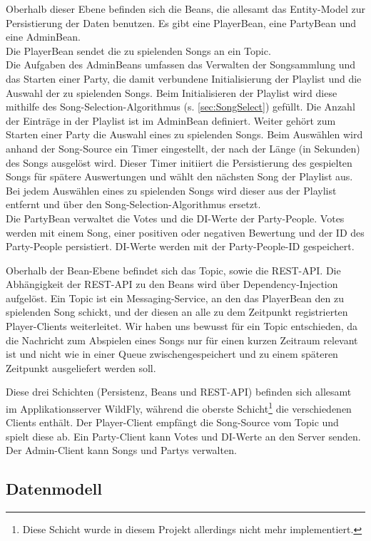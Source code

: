 Oberhalb dieser Ebene befinden sich die Beans, die allesamt das Entity-Model zur Persistierung der Daten benutzen. Es gibt eine PlayerBean, eine PartyBean und eine AdminBean.\\
Die PlayerBean sendet die zu spielenden Songs an ein Topic.\\ 
Die Aufgaben des AdminBeans umfassen das Verwalten der Songsammlung und das Starten einer Party, die damit verbundene Initialisierung der Playlist und die Auswahl der zu spielenden Songs. Beim Initialisieren der Playlist wird diese mithilfe des Song-Selection-Algorithmus (s. \ref{sec:SongSelect}) gefüllt. Die Anzahl der Einträge in der Playlist ist im AdminBean definiert. Weiter gehört zum Starten einer Party die Auswahl eines zu spielenden Songs. Beim Auswählen wird anhand der Song-Source ein Timer eingestellt, der nach der Länge (in Sekunden) des Songs ausgelöst wird. Dieser Timer initiiert die Persistierung des gespielten Songs für spätere Auswertungen und wählt den nächsten Song der Playlist aus. Bei jedem Auswählen eines zu spielenden Songs wird dieser aus der Playlist entfernt und über den Song-Selection-Algorithmus ersetzt.\\
Die PartyBean verwaltet die Votes und die DI-Werte der Party-People. Votes werden mit einem Song, einer positiven oder negativen Bewertung und der ID des Party-People persistiert. DI-Werte werden mit der Party-People-ID gespeichert.

Oberhalb der Bean-Ebene befindet sich das Topic, sowie die REST-API. Die Abhängigkeit der REST-API zu den Beans wird über Dependency-Injection aufgelöst. Ein Topic ist ein Messaging-Service, an den das PlayerBean den zu spielenden Song schickt, und der diesen an alle zu dem Zeitpunkt registrierten Player-Clients weiterleitet. Wir haben uns bewusst für ein Topic entschieden, da die Nachricht zum Abspielen eines Songs nur für einen kurzen Zeitraum relevant ist und nicht wie in einer Queue zwischengespeichert und zu einem späteren Zeitpunkt ausgeliefert werden soll.

Diese drei Schichten (Persistenz, Beans und REST-API) befinden sich allesamt im Applikationsserver WildFly, während die oberste Schicht\footnote{Diese Schicht wurde in diesem Projekt allerdings nicht mehr implementiert.} die verschiedenen Clients enthält. Der Player-Client empfängt die Song-Source vom Topic und spielt diese ab. Ein Party-Client kann Votes und DI-Werte an den Server senden. Der Admin-Client kann Songs und Partys verwalten.

\subsection{Datenmodell}

